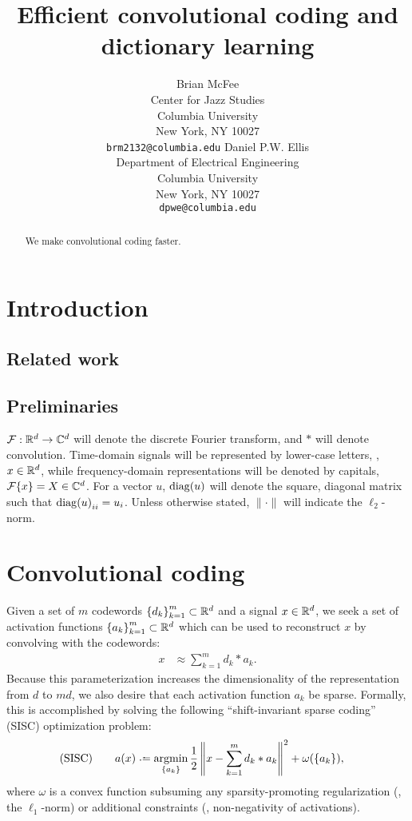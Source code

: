 \documentclass{article} %
\title{Efficient convolutional coding and dictionary learning}
\author{
Brian McFee\\
Center for Jazz Studies\\
Columbia University\\
New York, NY 10027 \\
\texttt{brm2132@columbia.edu}
\And
Daniel P.W. Ellis\\
Department of Electrical Engineering\\
Columbia University\\
New York, NY 10027\\
\texttt{dpwe@columbia.edu}
}
\begin{document}
\maketitle

\begin{abstract}
We make convolutional coding faster.
\end{abstract}

\section{Introduction}
\cite{mairal2010}


\subsection{Related work}
\cite{grosse2007}

\subsection{Preliminaries}
$\mathcal{F}:\mathbb{R}^d\rightarrow\mathbb{C}^d$ will denote the discrete Fourier transform, and $*$ will denote
convolution.
Time-domain signals will be represented by lower-case letters, \eg, $x \in \mathbb{R}^d$, while
frequency-domain representations will be denoted by capitals, $\mathcal{F}\{x\} = X \in \mathbb{C}^d$.
For a vector $u$, $\operatorname{diag}(u)$ will denote the square, diagonal matrix such that 
${\operatorname{diag}(u)}_{ii} = u_i$.  Unless otherwise stated, $\|\cdot\|$ will indicate the
$\ell_2$-norm.

\section{Convolutional coding}
\label{sec:convcode}
Given a set of $m$ codewords ${\{d_k\}}_{k=1}^m \subset \mathbb{R}^d$ and a signal $x\in\mathbb{R}^d$, 
we seek a set of activation functions ${\{a_k\}}_{k=1}^m\subset\mathbb{R}^d$ which
can be used to reconstruct $x$ by convolving with the codewords:
\begin{align}
x &\approx \sum_{k=1}^m d_k * a_k.\label{eq:convapprox}
\end{align}
Because this parameterization increases the dimensionality of the representation from $d$ 
to $md$, we also desire that each activation function $a_k$ be sparse.  
Formally, this is accomplished by solving the following ``shift-invariant sparse
coding'' (SISC) optimization problem:
\begin{align}
\text{(SISC)}\quad\quad a(x) &\defeq \argmin_{\{a_k\}} \frac{1}{2} \left\|x - \sum_{k=1}^m d_k * a_k\right\|^2 +
\omega(\{a_k\}), \label{eq:sisc}
\end{align}
where $\omega$ is a convex function subsuming any sparsity-promoting regularization 
(\eg, the $\ell_1$-norm) or additional constraints (\eg, non-negativity of activations).
\end{document}
